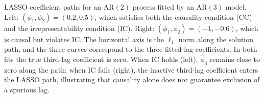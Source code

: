 \caption{LASSO coefficient paths for an AR$(2)$ process fitted by an AR$(3)$ model. 
Left: $(\phi_1,\phi_2)=(0.2,0.5)$, which satisfies both the causality condition (CC) 
and the irrepresentability condition (IC). Right: $(\phi_1,\phi_2)=(-1,-0.6)$, 
which is causal but violates IC. The horizontal axis is the $\ell_1$ norm along 
the solution path, and the three curves correspond to the three fitted lag 
coefficients. In both fits the true third-lag coefficient is zero. When IC holds 
(left), $\widehat{\phi}_3$ remains close to zero along the path; when IC fails 
(right), the inactive third-lag coefficient enters the LASSO path, illustrating 
that causality alone does not guarantee exclusion of a spurious lag.}
\label{fig:vars-ar2-lasso-paths}
